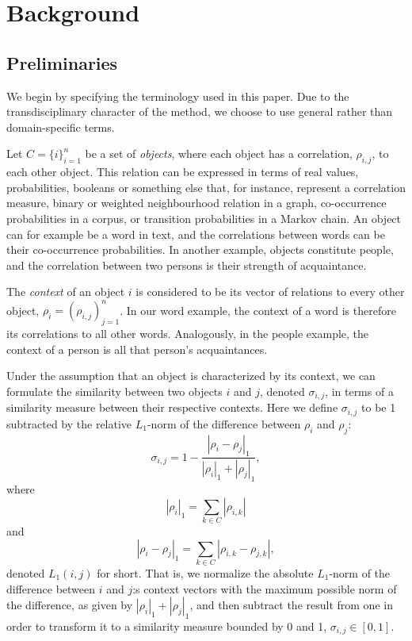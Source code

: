 \documentclass{kais}
\newcommand{\rn}[1]{\rho_{#1}}
\newcommand{\rns}[1]{|\rn{#1}|_1}
\newcommand{\sy}[1]{\sigma_{#1}}
\newcommand{\nm}[1]{L_1(#1)}
\newcommand{\dnm}[2]{|\rn{#1}-\rn{#2}|_1}
\begin{document}
\section{Background}
\label{sec:background}

\subsection{Preliminaries}
\label{sec:preliminaries}

We begin by specifying the terminology used in this paper. Due to the transdisciplinary character of the method, we
 choose to use general rather than domain-specific terms.

Let $C = \{i\}_{i=1}^n$ be a set of \emph{objects}, where each object has a correlation, $\rn{i,j}$, to
each other object. This relation can be expressed in terms of real values, probabilities, booleans or something
else that, for instance, represent a correlation measure, binary or weighted neighbourhood relation in a graph,
co-occurrence probabilities in a corpus, or transition probabilities in a Markov chain. An object can for example be a 
word in text, and the correlations between words can be their co-occurrence probabilities. In another example, objects 
constitute people, and the correlation between two persons is their strength of acquaintance.

The \emph{context} of an object $i$ is considered to be its vector of relations to every other object, $\rn{i} =
(\rn{i,j})_{j=1}^n$. In our word example, the context of a word is therefore its correlations to all other words. Analogously, 
in the people example, the context of a person is all that person's acquaintances.

Under the assumption that an object is characterized by its context, we can formulate the
similarity between two objects $i$ and $j$, denoted $\sy{i,j}$, in terms of a similarity measure between their
respective contexts.
Here we define $\sy{i,j}$ to be 1 subtracted by the relative $L_1$-norm of the difference between $\rn{i}$ and $\rn{j}$:
\begin{equation}\label{eq:sim}
\sy{i,j} = 1 - \frac{\dnm{i}{j}}{\rns{i} + \rns{j}},
\end{equation}
where
\begin{equation}\label{eq:totrel}
\rns{i} = \sum_{k \in C} | \rn{i,k}|
\end{equation}
and
\begin{equation}\label{}
\dnm{i}{j} =  \sum_{k \in C} | \rn{i,k} - \rn{j,k} |,
\end{equation}
denoted $\nm{i,j}$ for short.
That is, we normalize the absolute $L_1$-norm of the difference between $i$ and $j$:s context vectors with the maximum
possible norm of the difference, as given by $\rns{i} + \rns{j}$, and then subtract the result from one in order to
transform it to a similarity measure bounded by 0 and 1, $\sy{i,j} \in [0, 1]$.
\end{document}
